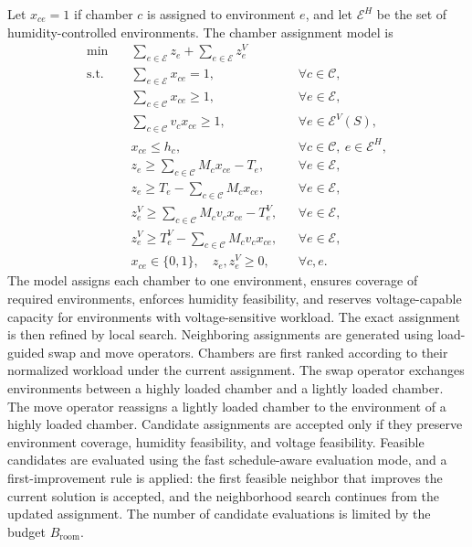 \documentclass[11pt]{article}
\begin{document}
Let \(x_{ce}=1\) if chamber \(c\) is assigned to environment \(e\), and let \(\mathcal{E}^H\) be the set of humidity-controlled environments. The chamber assignment model is
\begin{align}
\min\quad
& \sum_{e\in\mathcal{E}}z_e+\sum_{e\in\mathcal{E}}z_e^V
\\
\text{s.t.}\quad
& \sum_{e\in\mathcal{E}}x_{ce}=1,
&& \forall c\in\mathcal{C},
\\
& \sum_{c\in\mathcal{C}}x_{ce}\ge 1,
&& \forall e\in\mathcal{E},
\\
& \sum_{c\in\mathcal{C}}v_cx_{ce}\ge 1,
&& \forall e\in\mathcal{E}^V(S),
\\
& x_{ce}\le h_c,
&& \forall c\in\mathcal{C},\ e\in\mathcal{E}^H,
\\
& z_e\ge \sum_{c\in\mathcal{C}}M_cx_{ce}-T_e,
&& \forall e\in\mathcal{E},
\\
& z_e\ge T_e-\sum_{c\in\mathcal{C}}M_cx_{ce},
&& \forall e\in\mathcal{E},
\\
& z_e^V\ge \sum_{c\in\mathcal{C}}M_cv_cx_{ce}-T_e^V,
&& \forall e\in\mathcal{E},
\\
& z_e^V\ge T_e^V-\sum_{c\in\mathcal{C}}M_cv_cx_{ce},
&& \forall e\in\mathcal{E},
\\
& x_{ce}\in\{0,1\},\quad z_e,z_e^V\ge 0,
&& \forall c,e.
\end{align}
The model assigns each chamber to one environment, ensures coverage of required environments, enforces humidity feasibility, and reserves voltage-capable capacity for environments with voltage-sensitive workload.
The exact assignment is then refined by local search. Neighboring assignments are generated using load-guided swap and move operators. Chambers are first ranked according to their normalized workload under the current assignment. The swap operator exchanges environments between a highly loaded chamber and a lightly loaded chamber. The move operator reassigns a lightly loaded chamber to the environment of a highly loaded chamber. Candidate assignments are accepted only if they preserve environment coverage, humidity feasibility, and voltage feasibility. Feasible candidates are evaluated using the fast schedule-aware evaluation mode, and a first-improvement rule is applied: the first feasible neighbor that improves the current solution is accepted, and the neighborhood search continues from the updated assignment. The number of candidate evaluations is limited by the budget \(B_{\mathrm{room}}\).
\end{document}
